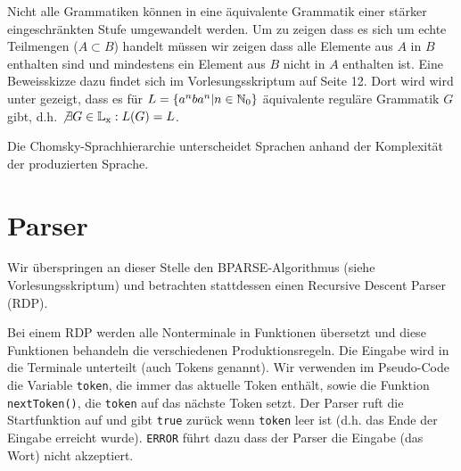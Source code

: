 Nicht alle Grammatiken können in eine äquivalente Grammatik einer stärker eingeschränkten Stufe umgewandelt werden. Um zu zeigen dass es sich um echte Teilmengen ($A \subset B$) handelt müssen wir zeigen dass alle Elemente aus $A$ in $B$ enthalten sind und mindestens ein Element aus $B$ nicht in $A$ enthalten ist.
Eine Beweisskizze dazu findet sich im Vorlesungsskriptum auf Seite 12. Dort wird wird unter gezeigt, dass es für $L=\left\{a^n b a^n|n \in \mathbb{N}_0\right\}$ äquivalente reguläre Grammatik $G$ gibt, d.h. $\not \exists G \in \mathbb{L}_{\text{x}} : L(G) = L$.

Die Chomsky-Sprachhierarchie unterscheidet Sprachen anhand der Komplexität der produzierten Sprache.

\section{Parser}\label{subsec:parser}
Wir überspringen an dieser Stelle den BPARSE-Algorithmus (siehe Vorlesungsskriptum) und betrachten stattdessen
einen Recursive Descent Parser (RDP).

Bei einem RDP werden alle Nonterminale in Funktionen übersetzt und diese Funktionen behandeln die verschiedenen Produktionsregeln.
Die Eingabe wird in die Terminale unterteilt (auch Tokens genannt).
Wir verwenden im Pseudo-Code die Variable \verb|token|, die immer das aktuelle Token enthält, sowie die Funktion \verb|nextToken()|, die \verb|token| auf das nächste Token setzt.
Der Parser ruft die Startfunktion auf und gibt \verb|true| zurück wenn \verb|token| leer ist (d.h. das Ende der Eingabe erreicht wurde). \verb|ERROR| führt dazu dass der Parser die Eingabe (das Wort) nicht akzeptiert.

